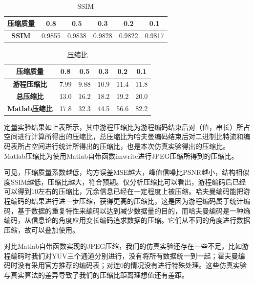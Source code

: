 \begin{table}[h!]
    \begin{center}
        \caption{SSIM}
        \begin{tabular}{c|ccccc}
            \textbf{压缩质量} & 0.8 & 0.5 & 0.3 & 0.2 & 0.1 \\
            \hline
            \textbf{SSIM} & 0.9855 & 0.9838 & 0.9828 & 0.9822 & 0.9817 \\
        \end{tabular}
    \end{center}
\end{table}

\begin{table}[h!]
    \begin{center}
        \caption{压缩比}
        \begin{tabular}{c|ccccc}
            \textbf{压缩质量} & 0.8 & 0.5 & 0.3 & 0.2 & 0.1 \\
            \hline
            \textbf{游程压缩比}     & 7.99 & 9.88 & 10.9 & 11.4 & 11.8 \\
            \textbf{总压缩比}       & 13.0 & 16.2 & 18.2 & 19.2 & 20.0 \\
            \textbf{Matlab压缩比}   & 17.8 & 32.3 & 44.5 & 56.6 & 82.2 \\
        \end{tabular}
    \end{center}
\end{table}

定量实验结果如上表所示，其中游程压缩比为游程编码结束后对（值，串长）所占空间进行计算所得出的压缩比，总压缩比为哈夫曼编码结束后对二进制比特流和编码表所占空间进行统计所得出的压缩比，也是本次仿真实验得出的压缩比。Matlab压缩比为使用Matlab自带函数imwrite进行JPEG压缩所得到的压缩比。

可见，压缩质量系数越低，均方误差MSE越大，峰值信噪比PSNR越小，结构相似度SSIM越低，压缩比越大，符合预期。仅分析压缩比可以看出，游程编码后已经可以得到10左右的压缩比，冗余信息已经在一定程度上被压缩。哈夫曼编码能把游程编码的结果进行进一步压缩，获得更高的压缩比，这是因为游程编码属于统计编码，基于数据的重复特性来编码以达到减少数据量的目的，而哈夫曼编码是一种熵编码，从信息论的角度应用变长编码追求数据的压缩。它们从不同的角度进行数据压缩，故可以叠加使用。

对比Matlab自带函数实现的JPEG压缩，我们的仿真实验还存在一些不足，比如游程编码时我们对YUV三个通道分别进行，没有将所有数据统一到一起；霍夫曼编码时没有采用官方推荐的编码表；对连0的情况没有进行特殊处理。这些仿真实验与真实算法的差异导致了我们的压缩比距离理想值还有差距。
